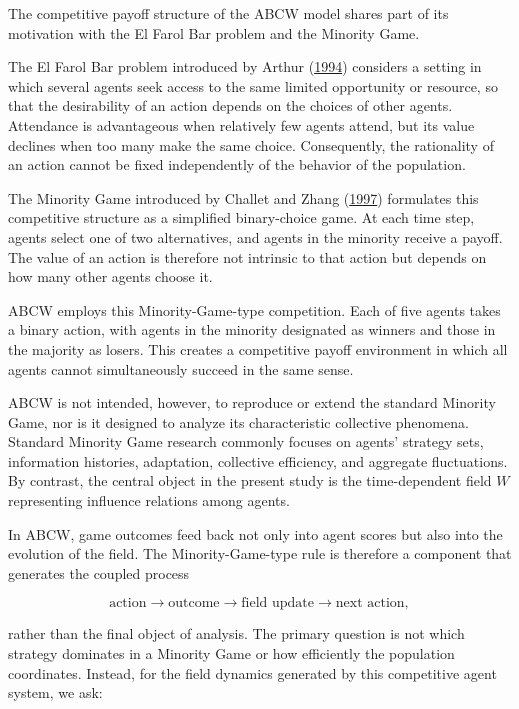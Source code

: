 \documentclass[
  11pt,
]{article}
\begin{document}
The competitive payoff structure of the ABCW model shares part of its
motivation with the El Farol Bar problem and the Minority Game.

The El Farol Bar problem introduced by Arthur
(\protect\hyperlink{ref-arthur1994}{1994}) considers a setting in which
several agents seek access to the same limited opportunity or resource,
so that the desirability of an action depends on the choices of other
agents. Attendance is advantageous when relatively few agents attend,
but its value declines when too many make the same choice. Consequently,
the rationality of an action cannot be fixed independently of the
behavior of the population.

The Minority Game introduced by Challet and Zhang
(\protect\hyperlink{ref-challet1997}{1997}) formulates this competitive
structure as a simplified binary-choice game. At each time step, agents
select one of two alternatives, and agents in the minority receive a
payoff. The value of an action is therefore not intrinsic to that action
but depends on how many other agents choose it.

ABCW employs this Minority-Game-type competition. Each of five agents
takes a binary action, with agents in the minority designated as winners
and those in the majority as losers. This creates a competitive payoff
environment in which all agents cannot simultaneously succeed in the
same sense.

ABCW is not intended, however, to reproduce or extend the standard
Minority Game, nor is it designed to analyze its characteristic
collective phenomena. Standard Minority Game research commonly focuses
on agents' strategy sets, information histories, adaptation, collective
efficiency, and aggregate fluctuations. By contrast, the central object
in the present study is the time-dependent field \({W}\) representing
influence relations among agents.

In ABCW, game outcomes feed back not only into agent scores but also
into the evolution of the field. The Minority-Game-type rule is
therefore a component that generates the coupled process

\[{\text{action}\longrightarrow\text{outcome}\longrightarrow\text{field update}\longrightarrow\text{next action},}\]

rather than the final object of analysis. The primary question is not
which strategy dominates in a Minority Game or how efficiently the
population coordinates. Instead, for the field dynamics generated by
this competitive agent system, we ask:
\end{document}

